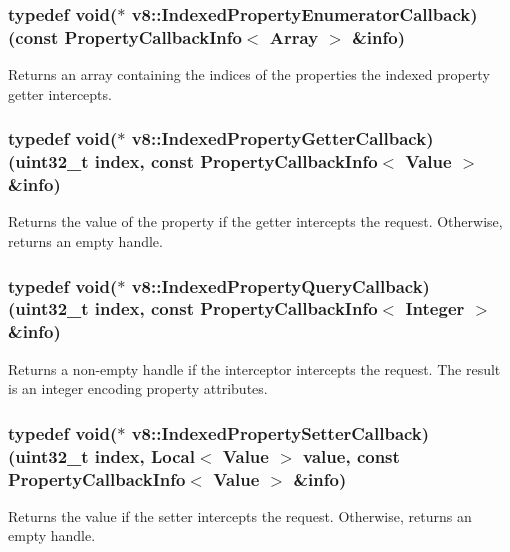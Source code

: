 \subsubsection[{\texorpdfstring{Indexed\+Property\+Enumerator\+Callback}{IndexedPropertyEnumeratorCallback}}]{\setlength{\rightskip}{0pt plus 5cm}typedef void($\ast$ v8\+::\+Indexed\+Property\+Enumerator\+Callback) (const {\bf Property\+Callback\+Info}$<$ {\bf Array} $>$ \&info)}\hypertarget{namespacev8_adbb0a6d5537371953f9ba807d4f6275e}{}\label{namespacev8_adbb0a6d5537371953f9ba807d4f6275e}
Returns an array containing the indices of the properties the indexed property getter intercepts. 
\subsubsection[{\texorpdfstring{Indexed\+Property\+Getter\+Callback}{IndexedPropertyGetterCallback}}]{\setlength{\rightskip}{0pt plus 5cm}typedef void($\ast$ v8\+::\+Indexed\+Property\+Getter\+Callback) (uint32\+\_\+t index, const {\bf Property\+Callback\+Info}$<$ {\bf Value} $>$ \&info)}\hypertarget{namespacev8_a48e7816ba64447bf32a25d194588daaf}{}\label{namespacev8_a48e7816ba64447bf32a25d194588daaf}
Returns the value of the property if the getter intercepts the request. Otherwise, returns an empty handle. 
\subsubsection[{\texorpdfstring{Indexed\+Property\+Query\+Callback}{IndexedPropertyQueryCallback}}]{\setlength{\rightskip}{0pt plus 5cm}typedef void($\ast$ v8\+::\+Indexed\+Property\+Query\+Callback) (uint32\+\_\+t index, const {\bf Property\+Callback\+Info}$<$ {\bf Integer} $>$ \&info)}\hypertarget{namespacev8_a980b62c33eb664783e61e25c3b27f9ee}{}\label{namespacev8_a980b62c33eb664783e61e25c3b27f9ee}
Returns a non-\/empty handle if the interceptor intercepts the request. The result is an integer encoding property attributes. 
\subsubsection[{\texorpdfstring{Indexed\+Property\+Setter\+Callback}{IndexedPropertySetterCallback}}]{\setlength{\rightskip}{0pt plus 5cm}typedef void($\ast$ v8\+::\+Indexed\+Property\+Setter\+Callback) (uint32\+\_\+t index, {\bf Local}$<$ {\bf Value} $>$ value, const {\bf Property\+Callback\+Info}$<$ {\bf Value} $>$ \&info)}\hypertarget{namespacev8_a4ac7cc6185ebc8b6a199f9fa8e6bf5c3}{}\label{namespacev8_a4ac7cc6185ebc8b6a199f9fa8e6bf5c3}
Returns the value if the setter intercepts the request. Otherwise, returns an empty handle. 
